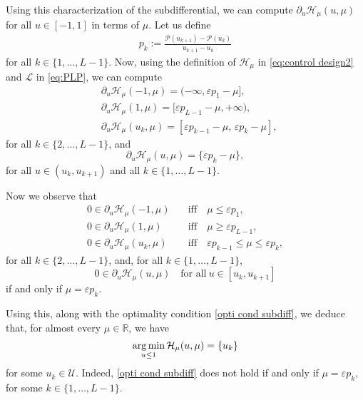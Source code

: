 \documentclass[twocolumn]{autart}    %
\begin{document}
\begin{remark}
Using this characterization of the subdifferential, we can compute $\partial_u\mathcal{H}_\mu(u,\mu)$ for all $u\in [-1,1]$ in terms of $\mu$.
Let us define
\begin{align*} 
	p_k := \frac{\mathcal{P}(u_{k+1}) - \mathcal{P} (u_k) }{u_{k+1} - u_k} 
\end{align*} 
for all $k\in \{1, \ldots, L-1\}$. Now, using the definition of $\mathcal{H}_\mu$ in \eqref{eq:control design2} and $\mathcal{L}$ in \eqref{eq:PLP}, we can compute
\begin{align*}
	&\partial_u \mathcal{H}_\mu (-1,\mu) = (-\infty, \varepsilon p_1 -\mu], 
	\\[5pt]
	&\partial_u \mathcal{H}_\mu (1,\mu) = [\varepsilon p_{L-1} -\mu, +\infty), 
	\\[5pt]
	&\partial_u \mathcal{H}_\mu (u_k,\mu) = [\varepsilon p_{k-1} -\mu,  \, \varepsilon p_k -\mu],
\end{align*}
for all $k\in \{ 2, \ldots, L-1\}$, and
\begin{equation*}
	\partial_u \mathcal{H}_\mu(u,\mu) = \{\varepsilon p_k -\mu\},
\end{equation*}
for all $u\in (u_k, u_{k+1})$ and all $k\in \{ 1, \ldots, L-1 \}$.

Now we observe that
\begin{equation}\label{eq:subdiff}
	\begin{array}{ll}
		0\in \partial_u \mathcal{H}_\mu (-1,\mu) & \quad\text{iff}\quad  \mu\leq  \varepsilon p_1, 
		\\[5pt]
		0\in \partial_u \mathcal{H}_\mu (1,\mu) & \quad\text{iff} \quad \mu\geq  \varepsilon p_{L-1}, 
		\\[5pt]
		0\in \partial_u \mathcal{H}_\mu (u_k,\mu) & \quad\text{iff} \quad  \varepsilon p_{k-1} \leq \mu \leq \varepsilon p_k , 
	\end{array} 
\end{equation}
for all $k\in \{ 2, \ldots, L-1\}$,  and, for all $k\in \{ 1, \ldots, L-1 \}$,
\begin{equation*}
	0\in \partial_u \mathcal{H}_\mu (u,\mu) \quad \text{for all}\  u\in [u_k, u_{k+1}]
\end{equation*}
if and only if $\mu= \varepsilon p_k$.

Using this, along with the optimality condition \eqref{opti cond subdiff}, we deduce that, for almost every $\mu\in \mathbb{R}$, we have
\begin{align*}
	\operatorname*{arg\,min}_{u\leq 1} \mathcal{H}_\mu (u,\mu) = \{u_k\}
\end{align*}
for some $u_k\in \mathcal{U}$. Indeed, \eqref{opti cond subdiff} does not hold if and only if $\mu= \varepsilon p_k$, for some $k\in \{1,\ldots, L-1\}$.


\end{remark}
\end{document}
